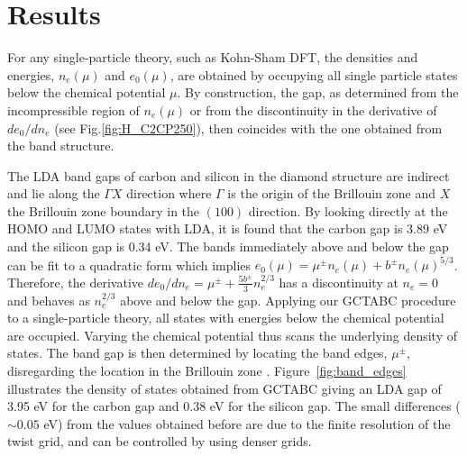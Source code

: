 \section{Results\label{sec:results}}

For any single-particle theory, such as Kohn-Sham DFT,
the densities and energies, $n_e(\mu)$ and $e_0(\mu)$,
are obtained by occupying all single particle states below the chemical potential $\mu$.
By construction, the gap, as determined from the incompressible region of $n_e(\mu)$ or from the discontinuity in the derivative of $de_0/dn_e$ (see Fig.\ref{fig:H_C2CP250}), then coincides with the one obtained from the band structure.

The LDA band gaps of carbon and silicon in the diamond structure are indirect and lie along the $\Gamma X$ direction where $\Gamma$ is the origin of the Brillouin zone and
$X$ the Brillouin zone boundary in the $(100)$ direction. By looking directly at the HOMO and LUMO states with LDA, it is found that
the carbon gap is 3.89 eV %
and the silicon gap is  0.34 eV.
The bands immediately above and below the gap can be fit
to a quadratic form which implies $e_0(\mu) = \mu^{\pm} n_e(\mu) + b^\pm n_e(\mu)^{5/3}$. Therefore, the derivative $de_0/dn_e = \mu^{\pm} + \frac{5b^{\pm}}{3} n_e^{2/3}$ has a discontinuity at $n_e=0$ and behaves as $ n_e^{2/3}$ above and below the gap. 
Applying our GCTABC procedure to a single-particle theory,
all states with energies below the chemical potential are occupied. Varying the chemical potential
thus scans the underlying density of states. The band gap is then determined by locating the band
edges, $\mu^\pm$, disregarding the location in the Brillouin zone \cite{BrillouinFootnote}.
Figure~\ref{fig:band_edges} illustrates the density of states
obtained from GCTABC giving an LDA gap of 3.95 eV for the carbon gap
and 0.38 eV for the silicon gap. %
The small differences ($\sim 0.05$ eV) from the values obtained before are due to the finite
resolution of the twist grid, and can be controlled by using denser grids.

